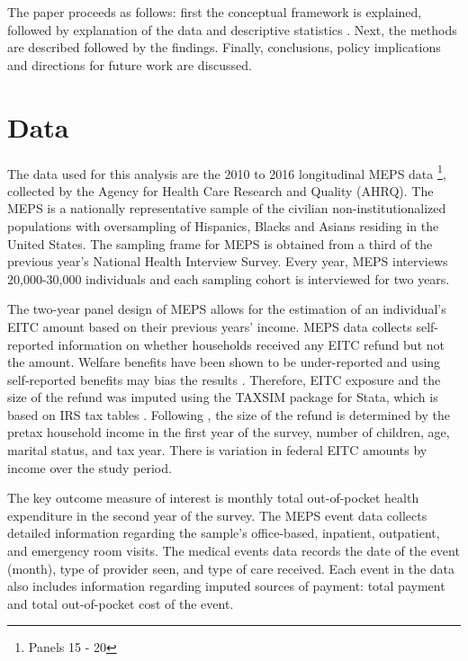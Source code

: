 \documentclass[smallcondensed,referee]{svjour3}
\begin{document}
The paper proceeds as follows: first the conceptual framework is explained, followed by explanation of the data and descriptive statistics . Next, the methods are described followed by the findings. Finally, conclusions, policy implications and directions for future work are discussed. 



\section{Data}
 
The data used for this analysis are the 2010 to 2016 longitudinal MEPS data \footnote{Panels 15 - 20}, collected by the Agency for Health Care Research and Quality (AHRQ). The MEPS is a nationally representative sample of the civilian non-institutionalized populations with oversampling of Hispanics, Blacks and Asians residing in the United States. The sampling frame for MEPS is obtained from a third of the previous year’s National Health Interview Survey. Every year, MEPS interviews 20,000-30,000 individuals and each sampling cohort is interviewed for two years.


The two-year panel design of MEPS allows for the estimation of an individual's EITC amount based on their previous years' income. MEPS data collects self- reported information on whether households received any EITC refund but not the amount. Welfare benefits have been shown to be under-reported and using self-reported benefits may bias the results \citep{meyer_household_2015}. Therefore, EITC exposure and the size of the refund was imputed using the TAXSIM package for Stata, which is based on IRS tax tables \citep{feenberg_introduction_1993}.  Following \cite{hamad_short-term_2019}, the size of the refund is determined by the pretax household income in the first year of the survey, number of children, age, marital status, and tax year. There is variation in federal EITC amounts by income over the study period.

The key outcome measure of interest is monthly total out-of-pocket health expenditure in the second year of the survey. The MEPS event data collects detailed information regarding the sample's office-based, inpatient, outpatient, and emergency room visits. The medical events data records the date of the event (month), type of provider seen, and type of care received. Each event in the data also includes information regarding imputed sources of payment: total payment and total out-of-pocket cost of the event. 
\end{document}
